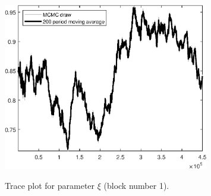 \begin{figure}[H]
\centering
  \includegraphics[width=0.8\textwidth]{BRS_sectoral_wo_vcu/graphs/TracePlot_xi_blck_1}\\
    \caption{Trace plot for parameter $\xi$ (block number 1).}
\end{figure}
